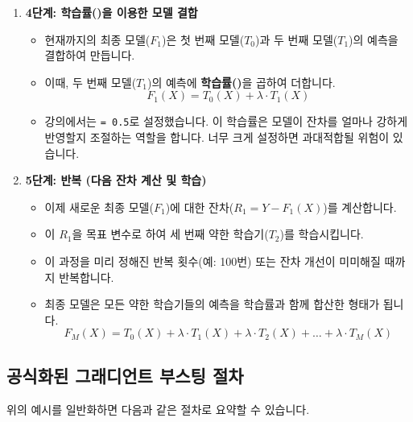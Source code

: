 \documentclass[11pt,a4paper]{book}
\theoremstyle{definition}
\begin{document}
\begin{tcolorbox}[example, title={회귀 문제 예시}]
\begin{enumerate}
    \item \textbf{4단계: 학습률(\texttt{\lambda})을 이용한 모델 결합}
    \begin{itemize}
        \item 현재까지의 최종 모델($F_1$)은 첫 번째 모델($T_0$)과 두 번째 모델($T_1$)의 예측을 결합하여 만듭니다.
        \item 이때, 두 번째 모델($T_1$)의 예측에 \textbf{학습률(\texttt{\lambda})}을 곱하여 더합니다.
        \[ F_1(X) = T_0(X) + \lambda \cdot T_1(X) \]
        \item 강의에서는 \texttt{\lambda = 0.5}로 설정했습니다. 이 학습률은 모델이 잔차를 얼마나 강하게 반영할지 조절하는 역할을 합니다. 너무 크게 설정하면 과대적합될 위험이 있습니다.
    \end{itemize}

    \item \textbf{5단계: 반복 (다음 잔차 계산 및 학습)}
    \begin{itemize}
        \item 이제 새로운 최종 모델($F_1$)에 대한 잔차($R_1 = Y - F_1(X)$)를 계산합니다.
        \item 이 $R_1$을 목표 변수로 하여 세 번째 약한 학습기($T_2$)를 학습시킵니다.
        \item 이 과정을 미리 정해진 반복 횟수(예: 100번) 또는 잔차 개선이 미미해질 때까지 반복합니다.
        \item 최종 모델은 모든 약한 학습기들의 예측을 학습률과 함께 합산한 형태가 됩니다.
        \[ F_M(X) = T_0(X) + \lambda \cdot T_1(X) + \lambda \cdot T_2(X) + \dots + \lambda \cdot T_M(X) \]
    \end{itemize}
\end{enumerate}
\end{tcolorbox}

\subsection{공식화된 그래디언트 부스팅 절차}
위의 예시를 일반화하면 다음과 같은 절차로 요약할 수 있습니다.
\end{document}
